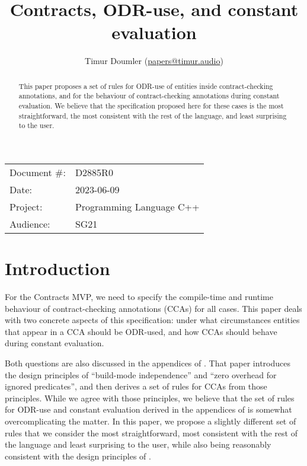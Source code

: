 


\title{Contracts, ODR-use, and constant evaluation}
\author{ Timur Doumler \small(\href{mailto:papers@timur.audio}{papers@timur.audio})}
\date{}
\maketitle

\begin{tabular}{ll}
Document \#: & D2885R0 \\
Date: &2023-06-09 \\
Project: & Programming Language C++ \\
Audience: & SG21
\end{tabular}

\begin{abstract}
This paper proposes a set of rules for ODR-use of entities inside contract-checking annotations, and for the behaviour of contract-checking annotations during constant evaluation. We believe that the specification proposed here for these cases is the most straightforward, the most consistent with the rest of the language, and least surprising to the user.
\end{abstract}

\section{Introduction}
\label{sec:intro}

For the Contracts MVP, we need to specify the compile-time and runtime behaviour of contract-checking annotations (CCAs) for all cases. This paper deals with two concrete aspects of this specification: under what circumstances entities that appear in a CCA should be ODR-used, and how CCAs should behave during constant evaluation.

Both questions are also discussed in the appendices of \cite{P2834R1}. That paper introduces the design principles of ``build-mode independence'' and ``zero overhead for ignored predicates'', and then derives a set of rules for CCAs from those principles. While we agree with those principles, we believe that the set of rules for ODR-use and constant evaluation derived in the appendices of \cite{P2834R1} is somewhat overcomplicating the matter. In this paper, we propose a slightly different set of rules that we consider the most straightforward, most consistent with the rest of the language and least surprising to the user, while also being reasonably consistent with the design principles of \cite{P2834R1}.


